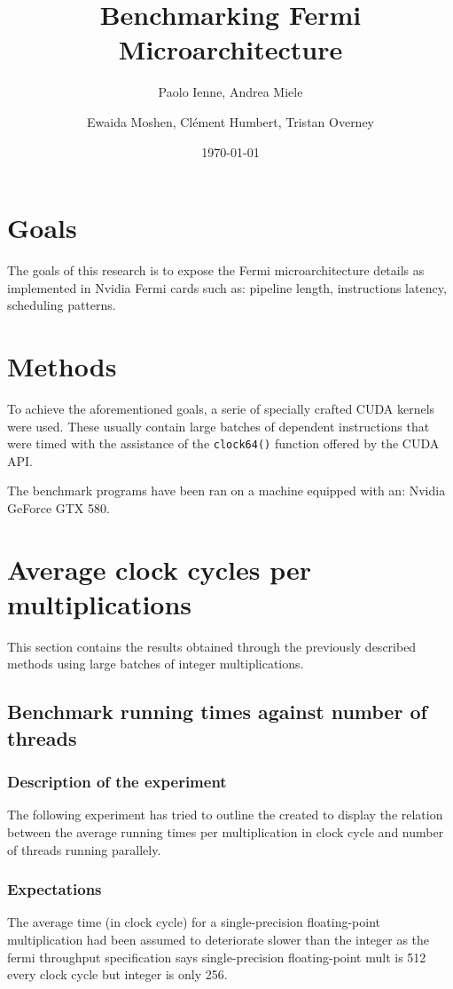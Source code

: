 \documentclass{article}
\begin{document}
\title{Benchmarking Fermi Microarchitecture}
\author{Paolo Ienne, Andrea Miele\and Ewaida Moshen, Cl\'{e}ment Humbert, Tristan Overney}
\date{\today}
\maketitle

\section{Goals}
	The goals of this research is to expose the Fermi microarchitecture details as implemented 
    in Nvidia Fermi cards such as: pipeline length, instructions latency, scheduling patterns.

\section{Methods}
	To achieve the aforementioned goals, a serie of specially crafted CUDA kernels
	were used. These usually contain large batches of dependent instructions that were 
	timed with the assistance of the \texttt{clock64()} function offered by the CUDA API.

	The benchmark programs have been ran on a machine equipped with an: 
	Nvidia GeForce GTX 580.
	\pagebreak

\section{Average clock cycles per multiplications}
	This section contains the results obtained through the previously described
	methods using large batches of integer multiplications.

	\subsection{Benchmark running times against number of threads}
	\label{sectiondassaut}
	\subsubsection{Description of the experiment}
	The following experiment has tried to outline the created to display the relation between the average running times per multiplication in clock cycle and number of threads running parallely.
	\subsubsection{Expectations}
	The average time (in clock cycle) for a single-precision floating-point multiplication had been assumed to deteriorate slower than the integer as the fermi throughput specification says single-precision floating-point mult is 512 every clock cycle but integer is only 256.
\end{document}
